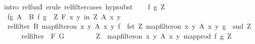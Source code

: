\begin{isabellebody}
%
\isadelimproof
%
\endisadelimproof
%
\isatagproof
{}\isamarkupfalse%
{\isacharparenleft}{\kern0pt}intro\ rel{\isacharunderscore}{\kern0pt}funI{\isacharsemicolon}{\kern0pt}\ erule\ rel{\isacharunderscore}{\kern0pt}filter{\isachardot}{\kern0pt}cases{\isacharsemicolon}{\kern0pt}\ hypsubst{\isacharparenright}{\kern0pt}\isanewline
\ \ \isamarkupfalse%
\ f\ g\ Z\isanewline
\ \ \isamarkupfalse%
\ fg{\isacharcolon}{\kern0pt}\ {\isachardoublequoteopen}{\isacharparenleft}{\kern0pt}A\ {\isacharequal}{\kern0pt}{\isacharequal}{\kern0pt}{\isacharequal}{\kern0pt}{\isachargreater}{\kern0pt}\ B{\isacharparenright}{\kern0pt}\ f\ g{\isachardoublequoteclose}\ \ Z{\isacharcolon}{\kern0pt}\ {\isachardoublequoteopen}{\isasymforall}\isactrlsub F\ {\isacharparenleft}{\kern0pt}x{\isacharcomma}{\kern0pt}\ y{\isacharparenright}{\kern0pt}\ in\ Z{\isachardot}{\kern0pt}\ A\ x\ y{\isachardoublequoteclose}\isanewline
\ \ \isamarkupfalse%
\ {\isachardoublequoteopen}rel{\isacharunderscore}{\kern0pt}filter\ B\ {\isacharparenleft}{\kern0pt}map{\isacharunderscore}{\kern0pt}filter{\isacharunderscore}{\kern0pt}on\ {\isacharbraceleft}{\kern0pt}{\isacharparenleft}{\kern0pt}x{\isacharcomma}{\kern0pt}\ y{\isacharparenright}{\kern0pt}{\isachardot}{\kern0pt}\ A\ x\ y{\isacharbraceright}{\kern0pt}\ {\isacharparenleft}{\kern0pt}f\ {\isasymcirc}\ fst{\isacharparenright}{\kern0pt}\ Z{\isacharparenright}{\kern0pt}\ {\isacharparenleft}{\kern0pt}map{\isacharunderscore}{\kern0pt}filter{\isacharunderscore}{\kern0pt}on\ {\isacharbraceleft}{\kern0pt}{\isacharparenleft}{\kern0pt}x{\isacharcomma}{\kern0pt}\ y{\isacharparenright}{\kern0pt}{\isachardot}{\kern0pt}\ A\ x\ y{\isacharbraceright}{\kern0pt}\ {\isacharparenleft}{\kern0pt}g\ {\isasymcirc}\ snd{\isacharparenright}{\kern0pt}\ Z{\isacharparenright}{\kern0pt}{\isachardoublequoteclose}\isanewline
\ \ \ \ {\isacharparenleft}{\kern0pt}\ {\isachardoublequoteopen}rel{\isacharunderscore}{\kern0pt}filter\ {\isacharunderscore}{\kern0pt}\ {\isacharquery}{\kern0pt}F\ {\isacharquery}{\kern0pt}G{\isachardoublequoteclose}{\isacharparenright}{\kern0pt}\isanewline
\ \ \isamarkupfalse%
\isanewline
\ \ \ \ \isamarkupfalse%
\ {\isacharquery}{\kern0pt}Z\ {\isacharequal}{\kern0pt}\ {\isachardoublequoteopen}map{\isacharunderscore}{\kern0pt}filter{\isacharunderscore}{\kern0pt}on\ {\isacharbraceleft}{\kern0pt}{\isacharparenleft}{\kern0pt}x{\isacharcomma}{\kern0pt}\ y{\isacharparenright}{\kern0pt}{\isachardot}{\kern0pt}\ A\ x\ y{\isacharbraceright}{\kern0pt}\ {\isacharparenleft}{\kern0pt}map{\isacharunderscore}{\kern0pt}prod\ f\ g{\isacharparenright}{\kern0pt}\ Z{\isachardoublequoteclose}\isanewline

\end{isabellebody}
